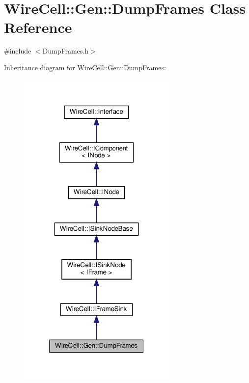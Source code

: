 \hypertarget{class_wire_cell_1_1_gen_1_1_dump_frames}{}\section{Wire\+Cell\+:\+:Gen\+:\+:Dump\+Frames Class Reference}
\label{class_wire_cell_1_1_gen_1_1_dump_frames}


{\ttfamily \#include $<$Dump\+Frames.\+h$>$}



Inheritance diagram for Wire\+Cell\+:\+:Gen\+:\+:Dump\+Frames\+:
\nopagebreak
\begin{figure}[H]
\begin{center}
\leavevmode
\includegraphics[width=223pt]{class_wire_cell_1_1_gen_1_1_dump_frames__inherit__graph}
\end{center}
\end{figure}


